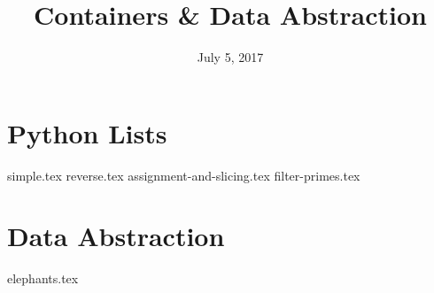 \documentclass{exam}
\title{Containers \& Data Abstraction}
\date{July 5, 2017}
\begin{document}
\maketitle

\section{Python Lists}
\begin{questions}
{simple.tex}
{reverse.tex}
\clearpage
{assignment-and-slicing.tex}
{filter-primes.tex}
\end{questions}

\clearpage

\section{Data Abstraction}
\begin{questions}
{elephants.tex}
\end{questions}
\end{document}
